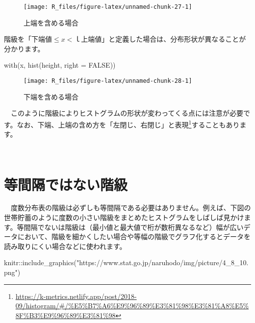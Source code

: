 \documentclass[
  12pt,
]{book}
\newenvironment{Shaded}{\begin{snugshade}}{\end{snugshade}}
\newcommand{\AttributeTok}[1]{\textcolor[rgb]{0.77,0.63,0.00}{#1}}
\newcommand{\ConstantTok}[1]{\textcolor[rgb]{0.00,0.00,0.00}{#1}}
\newcommand{\FunctionTok}[1]{\textcolor[rgb]{0.00,0.00,0.00}{#1}}
\newcommand{\NormalTok}[1]{#1}
\newcommand{\SpecialCharTok}[1]{\textcolor[rgb]{0.00,0.00,0.00}{#1}}
\newcommand{\StringTok}[1]{\textcolor[rgb]{0.31,0.60,0.02}{#1}}
\DeclareRobustCommand{\href}[2]{#2\footnote{\url{#1}}}
\begin{document}
\begin{figure}[H]

{\centering \texttt{[image: R\_files/figure-latex/unnamed-chunk-27-1]} 

}

\caption{上端を含める場合}\label{fig:unnamed-chunk-27}
\end{figure}

階級を「\(\mbox{下端値} \leq x <ｌ \mbox{上端値}\)」と定義した場合は、分布形状が異なることが分かります。

\begin{Shaded}
\begin{Highlighting}[]
\FunctionTok{with}\NormalTok{(x, }\FunctionTok{hist}\NormalTok{(height, }\AttributeTok{right =} \ConstantTok{FALSE}\NormalTok{))}
\end{Highlighting}
\end{Shaded}

\begin{figure}[H]

{\centering \texttt{[image: R\_files/figure-latex/unnamed-chunk-28-1]} 

}

\caption{下端を含める場合}\label{fig:unnamed-chunk-28}
\end{figure}

　このように階級によりヒストグラムの形状が変わってくる点には注意が必要です。なお、下端、上端の含め方を\href{https://k-metrics.netlify.app/post/2018-09/histogram/\#/\%E5\%B7\%A6\%E9\%96\%89\%E3\%81\%98\%E3\%81\%A8\%E5\%8F\%B3\%E9\%96\%89\%E3\%81\%98}{「左閉じ、右閉じ」と表現}することもあります。

　

\hypertarget{ux7b49ux9593ux9694ux3067ux306fux306aux3044ux968eux7d1a}{%
\section*{等間隔ではない階級}\label{ux7b49ux9593ux9694ux3067ux306fux306aux3044ux968eux7d1a}}

　度数分布表の階級は必ずしも等間隔である必要はありません。例えば、下図の世帯貯蓄のように度数の小さい階級をまとめたヒストグラムをしばしば見かけます。等間隔でないは階級は（最小値と最大値で桁が数桁異なるなど）幅が広いデータにおいて、階級を細かくしたい場合や等幅の階級でグラフ化するとデータを読み取りにくい場合などに使われます。

\begin{Shaded}
\begin{Highlighting}[]
\NormalTok{knitr}\SpecialCharTok{::}\FunctionTok{include\_graphics}\NormalTok{(}\StringTok{"https://www.stat.go.jp/naruhodo/img/picture/4\_8\_10.png"}\NormalTok{)}
\end{Highlighting}
\end{Shaded}
\end{document}
